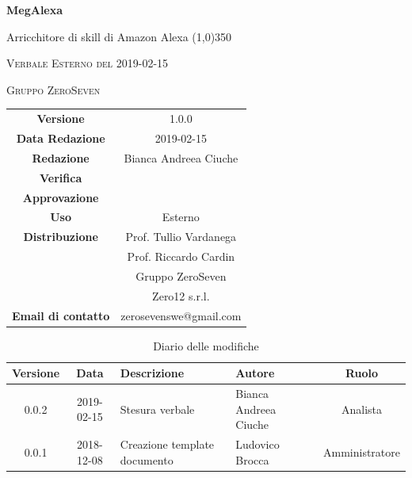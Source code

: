 \documentclass[a4paper,12pt]{article}
\author{Bianca Andreea Ciuche}
\date{2019-02-15}
\begin{document}
	\begin{titlepage}
		\centering
		{\huge\bfseries MegAlexa\par}
		Arricchitore di skill di Amazon Alexa
		\line(1,0){350} \\
		{\scshape\LARGE Verbale Esterno del 2019-02-15 \par}
		\vspace{1cm}
		{\scshape Gruppo ZeroSeven \par}
		\logo
		\begin{tabular}{c|c}
			{\hfill \textbf{Versione}} 			& 1.0.0				\\
			{\hfill\textbf{Data Redazione}} 	& 2019-02-15		\\ 
			{\hfill\textbf{Redazione}} 			&  		Bianca Andreea Ciuche		\\ 
			{\hfill\textbf{Verifica}} 				&  	  	\\ 
			{\hfill\textbf{Approvazione}} 		&  		\\ 
			{\hfill\textbf{Uso}} 					& 	Esterno	\\ 
			{\hfill\textbf{Distribuzione}} 			& 			Prof. Tullio Vardanega \\ & Prof. Riccardo Cardin \\ & Gruppo ZeroSeven \\ & Zero12 s.r.l.	\\ 
			{\hfill\textbf{Email di contatto}} & zerosevenswe@gmail.com \\
		\end{tabular}
	\end{titlepage}
	
	
	
	\label{LastFrontPage}
	
	
	\newpage
	\cleardoublepage
	\begin{table}[tbph]
		\centering
		\begin{tabularx}{\textwidth}{|c|c|X|X|c|}
			\hline
			\textbf{Versione} & \textbf{Data} & \textbf{Descrizione} & \textbf{Autore} & \textbf{Ruolo} \\
			\hline
			0.0.2 & 2019-02-15 & Stesura verbale &Bianca Andreea Ciuche  & Analista \\
			\hline
			0.0.1 & 2018-12-08 & Creazione template documento & Ludovico Brocca & Amministratore\\
			\hline
		\end{tabularx}
		\caption{Diario delle modifiche}
	\end{table}
	\cleardoublepage
	\pagestyle{mymain}
	
\end{document}
